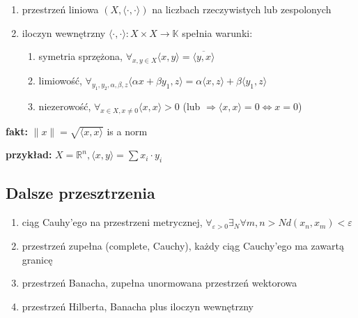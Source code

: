 \documentclass{article}
\begin{document}
\begin{enumerate}
\item przestrzeń liniowa $(X, \langle \cdot, \cdot \rangle)$ na liczbach rzeczywistych lub zespolonych
\item iloczyn wewnętrzny $\langle \cdot, \cdot \rangle: X \times X \to \mathbb{K}$ spełnia warunki:
\begin{enumerate}
\item symetria sprzężona, $\forall_{x,y \in X} \langle x,y \rangle = \overline{\langle y, x \rangle}$
\item limiowość, $\forall_{y_1, y_2,\alpha,\beta,z} \langle \alpha x + \beta y_1, z \rangle = \alpha \langle x, z \rangle + \beta \langle y_1, z \rangle$
\item niezerowość, $\forall_{x \in X, x \neq 0} \langle x, x \rangle > 0$ (lub $\Rightarrow \langle x, x \rangle = 0 \Leftrightarrow x = 0$)
\end{enumerate}
\end{enumerate}

\textbf{fakt:} $\|x\| = \sqrt{\langle x, x \rangle}$ is a norm

\textbf{przykład:} $X = \mathbb{R}^n, \langle x, y \rangle = \sum x_i \cdot y_i$

\begin{center}
\end{center}

\subsection{Dalsze przesztrzenia}

\begin{enumerate}
\item ciąg Cauhy'ego na przestrzeni metrycznej, $\forall_{\varepsilon > 0} \exists_N \forall{m,n>N} d(x_n,x_m) < \varepsilon$
\item przestrzeń zupełna (complete, Cauchy), każdy ciąg Cauchy'ego ma zawartą granicę
\item przestrzeń Banacha, zupełna unormowana przestrzeń wektorowa
\item przestrzeń Hilberta, Banacha plus iloczyn wewnętrzny
\end{enumerate}
\end{document}
